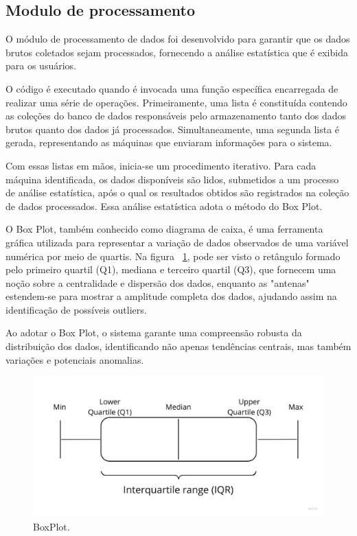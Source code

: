 \subsection{Modulo de processamento}
O módulo de processamento de dados foi desenvolvido para garantir que os dados brutos coletados sejam processados, fornecendo a análise estatística que é exibida para os usuários.

O código é executado quando é invocada uma função específica encarregada de realizar uma série de operações. Primeiramente, uma lista é constituída contendo as coleções do banco de dados responsáveis pelo armazenamento tanto dos dados brutos quanto dos dados já processados. Simultaneamente, uma segunda lista é gerada, representando as máquinas que enviaram informações para o sistema.

Com essas listas em mãos, inicia-se um procedimento iterativo. Para cada máquina identificada, os dados disponíveis são lidos, submetidos a um processo de análise estatística, após o qual os resultados obtidos são registrados na coleção de dados processados. Essa análise estatística adota o método do Box Plot.

O Box Plot, também conhecido como diagrama de caixa, é uma ferramenta gráfica utilizada para representar a variação de dados observados de uma variável numérica por meio de quartis. Na figura ~\ref{fig:boxplot}, pode ser visto o retângulo formado pelo primeiro quartil (Q1), mediana e terceiro quartil (Q3), que fornecem uma noção sobre a centralidade e dispersão dos dados, enquanto as "antenas" estendem-se para mostrar a amplitude completa dos dados, ajudando assim na identificação de possíveis outliers.

Ao adotar o Box Plot, o sistema garante uma compreensão robusta da distribuição dos dados, identificando não apenas tendências centrais, mas também variações e potenciais anomalias.

\begin{figure}[htbp]
	\centering
	\includegraphics[width=\textwidth]{images/boxplot.jpg}
	\caption{BoxPlot.}
	\label{fig:boxplot}
\end{figure}



